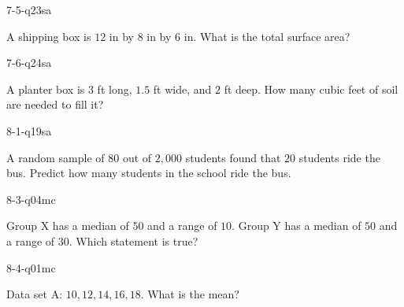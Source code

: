 \begin{practiceQuestion}{7-5-q23}{sa}
\begin{questionText}
A shipping box is $12$ in by $8$ in by $6$ in. What is the total surface area?
\end{questionText}
\end{practiceQuestion}

\begin{practiceQuestion}{7-6-q24}{sa}
\begin{questionText}
A planter box is $3$ ft long, $1.5$ ft wide, and $2$ ft deep. How many cubic feet of soil are needed to fill it?
\end{questionText}
\end{practiceQuestion}

\begin{practiceQuestion}{8-1-q19}{sa}
\begin{questionText}
A random sample of $80$ out of $2{,}000$ students found that $20$ students ride the bus. Predict how many students in the school ride the bus.
\end{questionText}
\end{practiceQuestion}

\begin{practiceQuestion}{8-3-q04}{mc}
\begin{questionText}
Group X has a median of $50$ and a range of $10$. Group Y has a median of $50$ and a range of $30$. Which statement is true?
\end{questionText}
\end{practiceQuestion}

\begin{practiceQuestion}{8-4-q01}{mc}
\begin{questionText}
Data set A: $10, 12, 14, 16, 18$. What is the mean?
\end{questionText}
\end{practiceQuestion}

